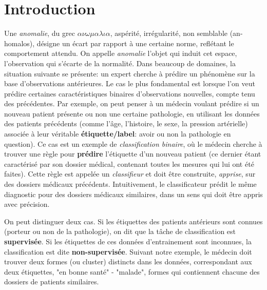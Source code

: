 \section{Introduction}
Une \emph{anomalie}, du grec $\alpha \nu \omega \mu \alpha \lambda \iota \alpha $, aspérité, irrégularité, non semblable (an-homalos), désigne un écart par rapport à une certaine norme, reflétant le comportement attendu.
On appelle \emph {anomalie} l'objet qui induit cet espace, l'observation qui s'écarte de la normalité.
%
Dans beaucoup de domaines, la situation suivante se présente: un expert cherche à prédire un phénomène sur la base d'observations antérieures. Le cas le plus fondamental est lorsque l'on veut prédire certaines caractéristiques binaires d'observations nouvelles, compte tenu des précédentes. Par exemple, on peut penser à un médecin voulant prédire si un nouveau patient présente ou non une certaine pathologie, en utilisant les données des patients précédents (comme l'âge, l'histoire, le sexe, la pression artérielle) associée à leur véritable \textbf{étiquette/label}: avoir ou non la pathologie en question). Ce cas est un exemple de \emph {classification binaire}, où le médecin cherche à trouver une règle pour \textbf {prédire} l'étiquette d'un nouveau patient (ce dernier étant caractérisé par son dossier médical, contenant toutes les mesures qui lui ont été faites). Cette règle est appelée un \emph{classifieur} et doit être construite, \emph{apprise}, sur des dossiers médicaux précédents. %
Intuitivement, le classificateur prédit le même diagnostic pour des dossiers médicaux similaires, dans un sens qui doit être appris avec précision.

On peut distinguer deux cas. Si les étiquettes des patients antérieurs sont connues (porteur ou non de la pathologie), on dit que la tâche de classification est \textbf {supervisée}. Si les étiquettes de ces données d'entrainement sont inconnues, la classification est dite \textbf {non-supervisée}. Suivant notre exemple, le médecin doit trouver deux formes (ou cluster) distincts dans les données, correspondant aux deux étiquettes, "en bonne santé" - "malade", formes qui contiennent chacune des dossiers de patients similaires.

